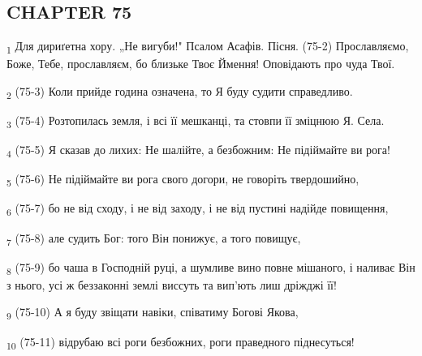 \subsection{CHAPTER 75}
\begin{tcolorbox}
\textsubscript{1} Для дириґетна хору. „Не вигуби!" Псалом Асафів. Пісня. (75-2) Прославляємо, Боже, Тебе, прославляєм, бо близьке Твоє Ймення! Оповідають про чуда Твої.
\end{tcolorbox}
\begin{tcolorbox}
\textsubscript{2} (75-3) Коли прийде година означена, то Я буду судити справедливо.
\end{tcolorbox}
\begin{tcolorbox}
\textsubscript{3} (75-4) Розтопилась земля, і всі її мешканці, та стовпи її зміцнюю Я. Села.
\end{tcolorbox}
\begin{tcolorbox}
\textsubscript{4} (75-5) Я сказав до лихих: Не шалійте, а безбожним: Не підіймайте ви рога!
\end{tcolorbox}
\begin{tcolorbox}
\textsubscript{5} (75-6) Не підіймайте ви рога свого догори, не говоріть твердошийно,
\end{tcolorbox}
\begin{tcolorbox}
\textsubscript{6} (75-7) бо не від сходу, і не від заходу, і не від пустині надійде повищення,
\end{tcolorbox}
\begin{tcolorbox}
\textsubscript{7} (75-8) але судить Бог: того Він понижує, а того повищує,
\end{tcolorbox}
\begin{tcolorbox}
\textsubscript{8} (75-9) бо чаша в Господній руці, а шумливе вино повне мішаного, і наливає Він з нього, усі ж беззаконні землі виссуть та вип'ють лиш дріжджі її!
\end{tcolorbox}
\begin{tcolorbox}
\textsubscript{9} (75-10) А я буду звіщати навіки, співатиму Богові Якова,
\end{tcolorbox}
\begin{tcolorbox}
\textsubscript{10} (75-11) відрубаю всі роги безбожних, роги праведного піднесуться!
\end{tcolorbox}
